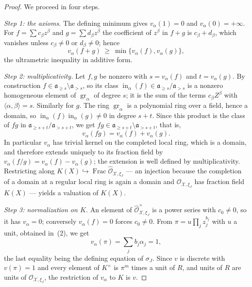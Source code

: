 \begin{proof}
We proceed in four steps.

\emph{Step 1: the axioms.} The defining minimum gives $v_\alpha(1)=0$ and
$v_\alpha(0)=+\infty$. For $f=\sum c_\beta z^\beta$ and
$g=\sum d_\beta z^\beta$ the coefficient of $z^\beta$ in $f+g$ is
$c_\beta+d_\beta$, which vanishes unless $c_\beta\neq0$ or
$d_\beta\neq0$; hence
\[
 v_\alpha(f+g)\ \ge\ \min\{v_\alpha(f),v_\alpha(g)\},
\]
the ultrametric inequality in additive form.

\emph{Step 2: multiplicativity.} Let $f,g$ be nonzero with
$s=v_\alpha(f)$ and $t=v_\alpha(g)$. By construction
$f\in\mathfrak a_{\ge s}\setminus\mathfrak a_{>s}$, so its class
$\operatorname{in}_\alpha(f)\in\mathfrak a_{\ge s}/\mathfrak a_{>s}$ is a
nonzero homogeneous element of $\operatorname{gr}_\alpha$ of degree
$s$; it is the sum of the terms $c_\beta Z^\beta$ with
$\langle\alpha,\beta\rangle=s$. Similarly for $g$. The ring
$\operatorname{gr}_\alpha$ is a polynomial ring over a field, hence a
domain, so
$\operatorname{in}_\alpha(f)\operatorname{in}_\alpha(g)\neq0$ in degree
$s+t$. Since this product is the class of $fg$ in
$\mathfrak a_{\ge s+t}/\mathfrak a_{>s+t}$, we get
$fg\in\mathfrak a_{\ge s+t}\setminus\mathfrak a_{>s+t}$, that is,
\[
 v_\alpha(fg)=v_\alpha(f)+v_\alpha(g).
\]
In particular $v_\alpha$ has trivial kernel on the completed local ring,
which is a domain, and therefore extends uniquely to its fraction field by
$v_\alpha(f/g)=v_\alpha(f)-v_\alpha(g)$; the extension is well defined by
multiplicativity. Restricting along
$K(X)\hookrightarrow\operatorname{Frac}\widehat{\mathcal O}_{\mathcal X,\xi_J}$
--- an injection because the completion of a domain at a regular local ring
is again a domain and $\mathcal O_{\mathcal X,\xi_J}$ has fraction field
$K(X)$ --- yields a valuation of $K(X)$.

\emph{Step 3: normalization on $K$.} An element of
$\widehat{\mathcal O}_{\mathcal X,\xi_J}^{\times}$ is a power series with
$c_0\neq0$, so it has $v_\alpha=0$; conversely $v_\alpha(f)=0$ forces
$c_0\neq0$. From $\pi=u\prod_jz_j^{b_j}$ with $u$ a unit, obtained in
\,(2), we get
\[
             v_\alpha(\pi)=\sum_jb_j\alpha_j=1,
\]
the last equality being the defining equation of $\sigma_J$. Since
$v$ is discrete with $v(\pi)=1$ and every element of $K^\times$ is
$\pi^m$ times a unit of $R$, and units of $R$ are units of
$\mathcal O_{\mathcal X,\xi_J}$, the restriction of $v_\alpha$ to $K$
is $v$.


\end{proof}
